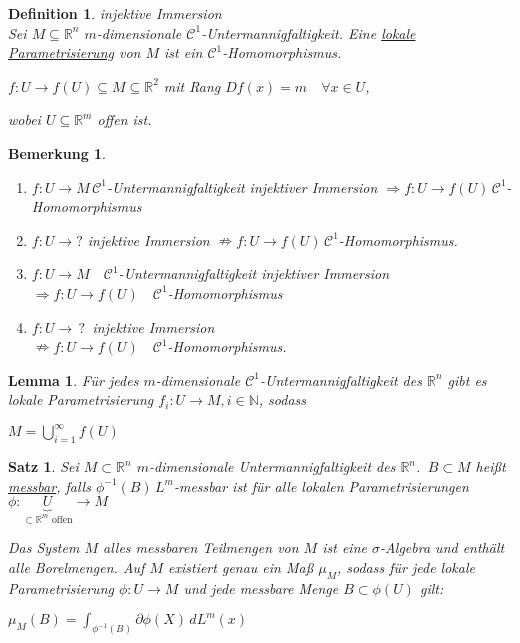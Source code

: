 \documentclass[11pt]{memoir}
\theoremstyle{changebreak}
\newtheorem{Definition}{Definition}[chapter]
\newtheorem{Bemerkung}{Bemerkung}[chapter]
\newtheorem{Lemma}{Lemma}[chapter]
\newtheorem{Satz}{Satz}[chapter]
\newcommand{\umgf}{$m$-dimensionale Untermannigfaltigkeit des $\mathbb R^n$}
\begin{document}
\begin{Definition}
\emph{injektive Immersion} \\
Sei $M \subseteq \mathbb R^n$ $m$-dimensionale $\mathscr C^1$-Untermannigfaltigkeit. Eine \underline{lokale Parametrisierung} von $M$ ist ein $\mathscr C^1$-Homomorphismus. 
\par\bigskip
$f: U \rightarrow f(U) \subseteq M \subseteq \mathbb R^2$ mit Rang $Df(x) = m \quad \forall x \in U$, 
\par
wobei $U \subseteq \mathbb R^m$ offen ist.
\end{Definition}

\begin{Bemerkung}
\begin{enumerate}
	\item $f: U \rightarrow M \, \mathscr C^1$-Untermannigfaltigkeit injektiver Immersion $\Rightarrow f:U \rightarrow f(U) \, \mathscr C^1$-Homomorphismus

	\item $f: U \rightarrow ?$ injektive Immersion $\nRightarrow f: U \rightarrow f(U) \, \mathscr C^1$-Homomorphismus.
	\item $f: U \rightarrow M \quad \mathscr C^1$-Untermannigfaltigkeit injektiver Immersion \\
	$\Rightarrow f:U \rightarrow f(U) \quad \mathscr C^1$-Homomorphismus
	
	\item $f: U \rightarrow \,?\,$ injektive Immersion \\
	$\nRightarrow f: U \rightarrow f(U) \quad \mathscr C^1$-Homomorphismus.
\end{enumerate}
\end{Bemerkung}

\begin{Lemma}
Für jedes $m$-dimensionale $\mathscr C^1$-Untermannigfaltigkeit des $\mathbb R^n$ gibt es lokale Parametrisierung $f_i: U \rightarrow M, i \in \mathbb N$, sodass
\begin{center}
	$M = \bigcup\limits_{i=1}^\infty f(U)$
\end{center}
\end{Lemma}


\begin{Satz}
Sei $M \subset \mathbb R^n$ \umgf. \,$ B \subset M$ heißt \underline{messbar}, falls $\phi^{-1}(B) \, L^m$-messbar ist für alle lokalen Parametrisierungen \\
 $\phi: \underbrace{U}_{\subset \mathbb R^m \text{ offen}} \rightarrow M$  
 \par\bigskip
 Das System $M$ alles messbaren Teilmengen von $M$ ist eine $\sigma$-Algebra und enthält alle Borelmengen. Auf $M$ existiert genau ein Maß $\mu_M$, sodass für jede lokale Parametrisierung $\phi: U \rightarrow M$ und jede messbare Menge $B \subset \phi(U)$ gilt:
 \begin{center}
 	$\mu_M(B) = \int_{\phi^{-1}(B)} \partial \phi(X) \, d L^m(x)$
 \end{center}
\end{Satz}
\end{document}
